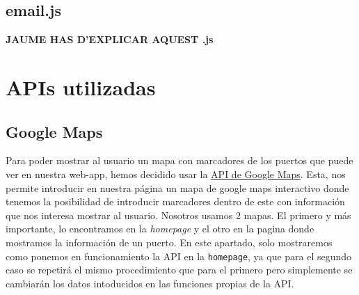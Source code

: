\documentclass{article}
\begin{document}
\subsection{email.js}
\textbf{JAUME HAS D'EXPLICAR AQUEST .js}


\section{APIs utilizadas}
\subsection{Google Maps}
Para poder mostrar al usuario un mapa con marcadores de los puertos que puede ver en nuestra web-app, hemos decidido usar la \href{https://developers.google.com/maps?hl=es%2F%3Fq%3Dapis%20google}{API de Google Maps}. Esta, nos permite introducir en nuestra página un mapa de google maps interactivo donde tenemos la posibilidad de introducir marcadores dentro de este con información que nos interesa mostrar al usuario. Nosotros usamos 2 mapas. El primero y más importante, lo encontramos en la \textit{homepage} y el otro en la pagina donde mostramos la información de un puerto. En este apartado, solo mostraremos como ponemos en funcionamiento la API en la \texttt{homepage}, ya que para el segundo caso se repetirá el mismo procedimiento que para el primero pero simplemente se cambiarán los datos intoducidos en las funciones propias de la API.\\
\end{document}
